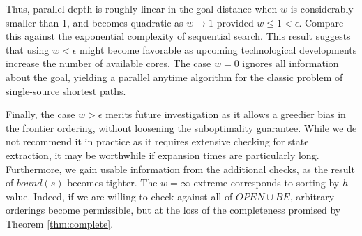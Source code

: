 \documentclass[letterpaper]{article}
\begin{document}

Thus, parallel depth is roughly linear in the goal distance when $w$ is considerably smaller than 1, and becomes quadratic as $w \rightarrow 1$ provided $w \le 1 < \epsilon$. Compare this against the exponential complexity of sequential search. This result suggests that using $w < \epsilon$ might become favorable as upcoming technological developments increase the number of available cores. The case $w = 0$ ignores all information about the goal, yielding a parallel anytime algorithm for the classic problem of single-source shortest paths.

Finally, the case $w > \epsilon$ merits future investigation as it allows a greedier bias in the frontier ordering, without loosening the suboptimality guarantee. While we de not recommend it in practice as it requires extensive checking for state extraction, it may be worthwhile if expansion times are particularly long. Furthermore, we gain usable information from the additional checks, as the result of $bound(s)$ becomes tighter. The $w = \infty$ extreme corresponds to sorting by $h$-value. Indeed, if we are willing to check against all of $OPEN\cup BE$, arbitrary orderings become permissible, but at the loss of the completeness promised by Theorem \ref{thm:complete}.
\end{document}
